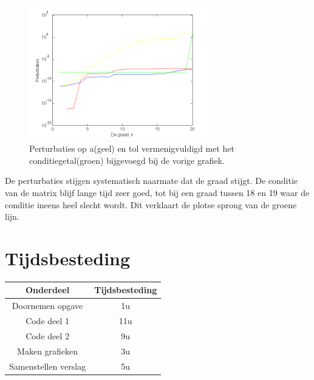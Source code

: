 \documentclass[11pt,a4paper]{article}
\begin{document}
\begin{figure}[H]
	\centering
	\includegraphics[width=0.7\textwidth]{22i1.png}
	\caption*{Perturbaties op a(geel) en tol vermenigvuldigd met het conditiegetal(groen) bijgevoegd bij de vorige grafiek.}
	\end{figure}
De perturbaties stijgen systematisch naarmate dat de graad stijgt. De conditie van de matrix blijf lange tijd zeer goed, tot bij een graad tussen 18 en 19 waar de conditie ineens heel slecht wordt. Dit verklaart de plotse sprong van de groene lijn.
\section{Tijdsbesteding}
\begin{center}
\begin{tabular}{ c || c }
Onderdeel & Tijdsbesteding\\
\hline
\hline
Doornemen opgave & 1u\\
\hline
Code deel 1 & 11u\\
\hline
Code deel 2 & 9u\\
\hline
Maken grafieken & 3u\\
\hline
Samenstellen verslag & 5u
\end{tabular}
\end{center}
\end{document}
